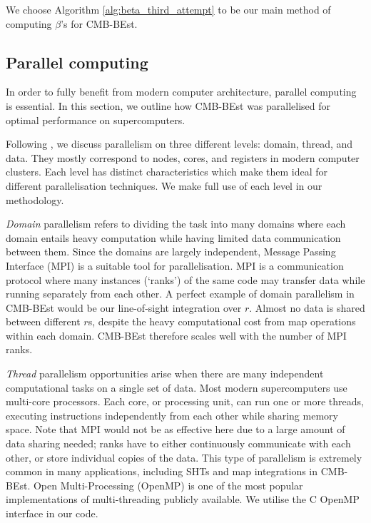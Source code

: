 We choose Algorithm \ref{alg:beta_third_attempt} to be our main method of computing $\beta$'s for CMB-BEst.

\subsection{Parallel computing}


In order to fully benefit from modern computer architecture, parallel computing is essential. In this section, we outline how CMB-BEst was parallelised for optimal performance on supercomputers.

Following \cite{Jeffers2016intel}, we discuss parallelism on three different levels: domain, thread, and data. They mostly correspond to nodes, cores, and registers in modern computer clusters. Each level has distinct characteristics which make them ideal for different parallelisation techniques. We make full use of each level in our methodology.

\textit{Domain} parallelism refers to dividing the task into many domains where each domain entails heavy computation while having limited data communication between them. Since the domains are largely independent, Message Passing Interface (MPI) is a suitable tool for parallelisation. MPI is a communication protocol where many instances (`ranks') of the same code may transfer data while running separately from each other. A perfect example of domain parallelism in CMB-BEst would be our line-of-sight integration over $r$. Almost no data is shared between different $r$s, despite the heavy computational cost from map operations within each domain. CMB-BEst therefore scales well with the number of MPI ranks.

\textit{Thread} parallelism opportunities arise when there are many independent computational tasks on a single set of data. Most modern supercomputers use multi-core processors. Each core, or processing unit, can run one or more threads, executing instructions independently from each other while sharing memory space. Note that MPI would not be as effective here due to a large amount of data sharing needed; ranks have to either continuously communicate with each other, or store individual copies of the data. This type of parallelism is extremely common in many applications, including SHTs and map integrations in CMB-BEst. Open Multi-Processing (OpenMP) is one of the most popular implementations of multi-threading publicly available. We utilise the \textsc{C} OpenMP interface in our code. 

